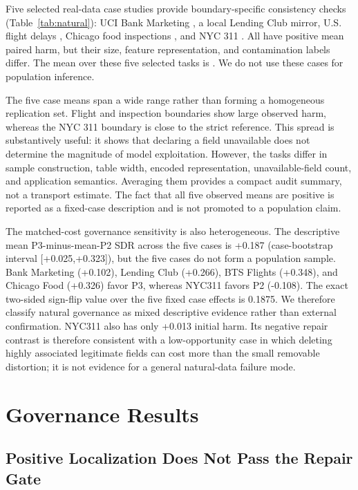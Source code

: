 \documentclass[sigconf,review]{acmart}
\begin{document}
Five selected real-data case studies provide boundary-specific consistency
checks (Table~\ref{tab:natural}): UCI Bank Marketing \cite{uciBankMarketing},
a local Lending Club mirror, U.S. flight delays \cite{btsOnTime}, Chicago food
inspections \cite{chicagoFoodInspections}, and NYC 311 \cite{nyc311}. All have
positive mean paired harm, but their size, feature representation, and
contamination labels differ. The mean over these five selected tasks is
\NaturalMeanHarm{}. We do not use these cases for population inference.

The five case means span a wide range rather than forming a homogeneous
replication set. Flight and inspection boundaries show large observed harm,
whereas the NYC 311 boundary is close to the strict reference. This spread is
substantively useful: it shows that declaring a field unavailable does not
determine the magnitude of model exploitation. However, the tasks differ in
sample construction, table width, encoded representation, unavailable-field
count, and application semantics. Averaging them provides a compact audit
summary, not a transport estimate. The fact that all five observed means are
positive is reported as a fixed-case description and is not promoted to a
population claim.

The matched-cost governance sensitivity is also heterogeneous. The descriptive
mean P3-minus-mean-P2 SDR across the five cases is +0.187 (case-bootstrap
interval [+0.025,+0.323]), but the five cases do not form a population sample.
Bank Marketing (+0.102), Lending Club (+0.266), BTS Flights (+0.348), and
Chicago Food (+0.326) favor P3, whereas NYC311 favors P2 (-0.108). The exact
two-sided sign-flip value over the five fixed case effects is 0.1875. We
therefore classify natural governance as mixed descriptive evidence rather
than external confirmation. NYC311 also has only +0.013 initial harm. Its
negative repair contrast is therefore consistent with a low-opportunity case
in which deleting highly associated legitimate fields can cost more than the
small removable distortion; it is not evidence for a general natural-data
failure mode.



\section{Governance Results}

\subsection{Positive Localization Does Not Pass the Repair Gate}
\end{document}
